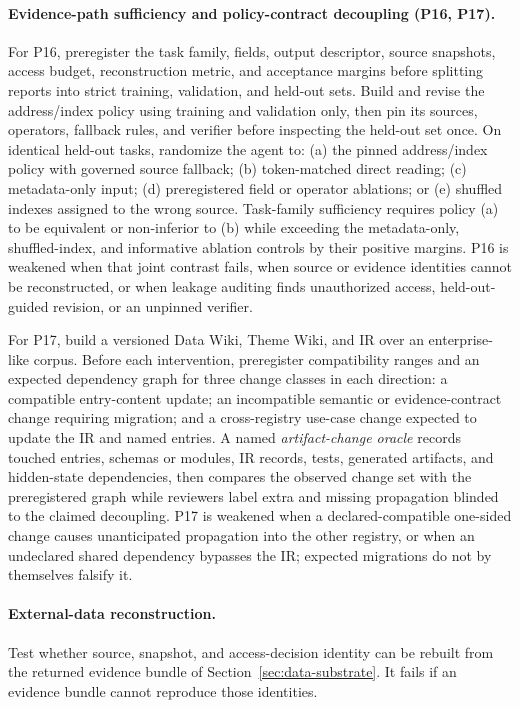 \paragraph{Evidence-path sufficiency and policy-contract decoupling (P16, P17).}
For P16, preregister the task family, fields, output descriptor, source snapshots, access budget, reconstruction metric, and acceptance margins before splitting reports into strict training, validation, and held-out sets. Build and revise the address/index policy using training and validation only, then pin its sources, operators, fallback rules, and verifier before inspecting the held-out set once. On identical held-out tasks, randomize the agent to: (a) the pinned address/index policy with governed source fallback; (b) token-matched direct reading; (c) metadata-only input; (d) preregistered field or operator ablations; or (e) shuffled indexes assigned to the wrong source. Task-family sufficiency requires policy (a) to be equivalent or non-inferior to (b) while exceeding the metadata-only, shuffled-index, and informative ablation controls by their positive margins. P16 is weakened when that joint contrast fails, when source or evidence identities cannot be reconstructed, or when leakage auditing finds unauthorized access, held-out-guided revision, or an unpinned verifier.

For P17, build a versioned Data Wiki, Theme Wiki, and IR over an enterprise-like corpus. Before each intervention, preregister compatibility ranges and an expected dependency graph for three change classes in each direction: a compatible entry-content update; an incompatible semantic or evidence-contract change requiring migration; and a cross-registry use-case change expected to update the IR and named entries. A named \textit{artifact-change oracle} records touched entries, schemas or modules, IR records, tests, generated artifacts, and hidden-state dependencies, then compares the observed change set with the preregistered graph while reviewers label extra and missing propagation blinded to the claimed decoupling. P17 is weakened when a declared-compatible one-sided change causes unanticipated propagation into the other registry, or when an undeclared shared dependency bypasses the IR; expected migrations do not by themselves falsify it.

\paragraph{External-data reconstruction.}
Test whether source, snapshot, and access-decision identity can be rebuilt from the returned evidence bundle of Section~\ref{sec:data-substrate}. It fails if an evidence bundle cannot reproduce those identities.

